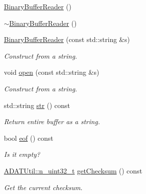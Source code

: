 \begin{DoxyCompactItemize}
\mbox{\hyperlink{classADATIO_1_1BinaryBufferReader_a9bb5e29231fc81acbe7f0e6ab2720f6c}{Binary\+Buffer\+Reader}} ()
\item 
\mbox{\hyperlink{classADATIO_1_1BinaryBufferReader_ab890177a0ac7f1e191ebd15d148fc48b}{$\sim$\+Binary\+Buffer\+Reader}} ()
\item 
\mbox{\hyperlink{classADATIO_1_1BinaryBufferReader_af3ef435054f2f29a596ca4b45b3642e5}{Binary\+Buffer\+Reader}} (const std\+::string \&s)
\begin{DoxyCompactList}\small\item\em Construct from a string. \end{DoxyCompactList}\item 
void \mbox{\hyperlink{classADATIO_1_1BinaryBufferReader_af56c8d00474a1f38f38267c45aa7b433}{open}} (const std\+::string \&s)
\begin{DoxyCompactList}\small\item\em Construct from a string. \end{DoxyCompactList}\item 
std\+::string \mbox{\hyperlink{classADATIO_1_1BinaryBufferReader_a1e960fee8100fbe85f706b45870d95e1}{str}} () const
\begin{DoxyCompactList}\small\item\em Return entire buffer as a string. \end{DoxyCompactList}\item 
bool \mbox{\hyperlink{classADATIO_1_1BinaryBufferReader_ad7957f285235c272d8874d1ab5ffea75}{eof}} () const
\begin{DoxyCompactList}\small\item\em Is it empty? \end{DoxyCompactList}\item 
\mbox{\hyperlink{namespaceADATUtil_ad945a8afa4db2d1f89b731964adae97e}{A\+D\+A\+T\+Util\+::n\+\_\+uint32\+\_\+t}} \mbox{\hyperlink{classADATIO_1_1BinaryBufferReader_ae8e6c22be76223f5e2ce2613e70be4bf}{get\+Checksum}} () const
\begin{DoxyCompactList}\small\item\em Get the current checksum. \end{DoxyCompactList}\end{DoxyCompactItemize}

